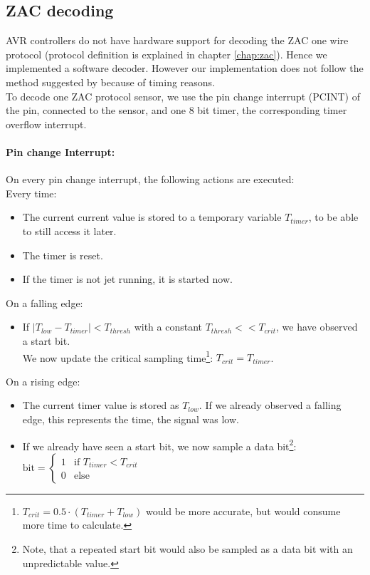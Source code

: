\documentclass[a4paper]{scrreprt}
\begin{document}
\subsection{ZAC decoding}
AVR controllers do not have hardware support for decoding the ZAC one wire
protocol (protocol definition is explained in chapter \ref{chap:zac}). Hence we
implemented a software decoder. However our implementation
does not follow the method suggested by \cite{zac} because of timing reasons.\\
To decode one ZAC protocol sensor, we use the pin change interrupt (PCINT) of the pin, connected to the sensor, and
one 8 bit timer, the corresponding timer overflow interrupt.
\paragraph{Pin change Interrupt:} On every pin change interrupt, the following actions are executed:\\
Every time:
\begin{itemize}
	\item The current current value is stored to a temporary variable $T_{timer}$, to be able to still access it later.
	\item The timer is reset.
	\item If the timer is not jet running, it is started now.
\end{itemize}
On a falling edge:
\begin{itemize}
	\item If $\left|T_{low} - T_{timer}\right| < T_{thresh}$ with a constant $T_{thresh} << T_{crit}$, we
		have observed a start bit.\\
		We now update the critical sampling time\footnote{$T_{crit} = 0.5\cdot(T_{timer} + T_{low})$ would
		be more accurate, but would consume more time to calculate.}: $T_{crit} = T_{timer}$.
\end{itemize}
On a rising edge:
\begin{itemize}
	\item The current timer value is stored as $T_{low}$. If we already observed a falling edge, this
		represents the time, the signal was low.
	\item If we already have seen a start bit, we now sample a data bit\footnote{Note, that a repeated
		start bit would also be sampled as a data bit with an unpredictable value.}:\\
	$\mathrm{bit} = \begin{cases} 1 & \text{if } T_{timer}<T_{crit} \\ 0 & \text{else}\end{cases}$
\end{itemize}
\end{document}
